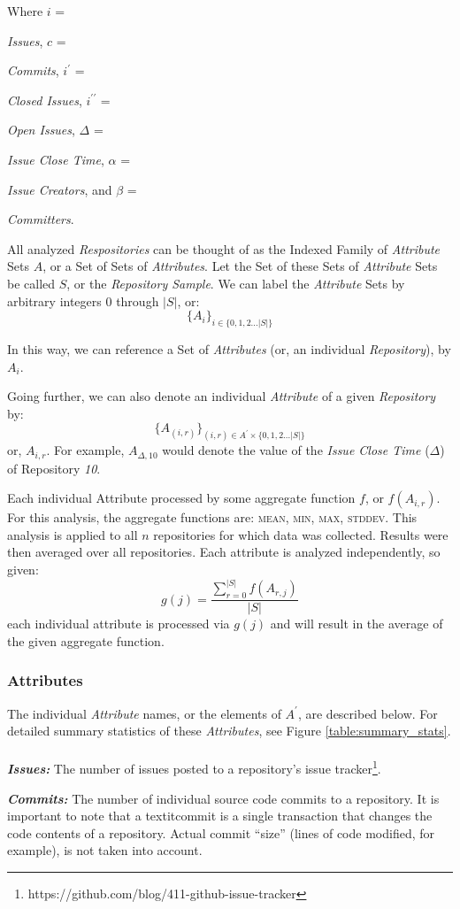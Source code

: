 \documentclass{proc}
\begin{document}
Where $i$ = {\textit{Issues}, $c$ = {\textit{Commits}, $i^\prime$ = {\textit{Closed Issues}, $i^{\prime\prime}$ = {\textit{Open Issues}, $\Delta$ = {\textit{Issue Close Time}, $\alpha$ = {\textit{Issue Creators}, and $\beta$ = {\textit{Committers}.

All analyzed \textit{Respositories} can be thought of as the Indexed Family of \textit{Attribute} Sets $A$, or a Set of Sets of \textit{Attributes}. Let the Set of these Sets of \textit{Attribute} Sets be called $S$, or the \textit{Repository Sample}. We can label the \textit{Attribute} Sets by arbitrary integers 0 through $|S|$, or:
\[ \{A_i\}_{i \in \{0,1,2 ... |S|\} }\]

In this way, we can reference a Set of \textit{Attributes} (or, an individual \textit{Repository}), by $A_i$. 

Going further, we can also denote an individual \textit{Attribute} of a given \textit{Repository} by:
\[ \{A_{(i,r)}\}_{(i,r) \in A^\prime \times \{0,1,2 ... |S|\} } \]
or, $A_{i,r}$. For example, $A_{\Delta,10}$ would denote the value of the \textit{Issue Close Time} ($\Delta$) of Repository \textit{10}.

Each individual Attribute processed by some aggregate function $f$, or $f(  A_{i,r} )$. For this analysis, the aggregate functions are: \textsc{mean}, \textsc{min}, \textsc{max}, \textsc{stddev}. This analysis is applied to all $n$ repositories for which data was collected. Results were then averaged over all repositories. Each attribute is analyzed independently, so given:
\[ g(j) = \frac{\sum\limits_{r = 0}^{|S|} f(  A_{r,j}  ) }{|S|} \]
each individual attribute is processed via $g(j)$ and will result in the average of the given aggregate function.

\subsubsection{Attributes}
\label{sec:attributes}
The individual \textit{Attribute} names, or the elements of $A^\prime$, are described below. For detailed summary statistics of these \textit{Attributes}, see Figure  \ref{table:summary_stats}.\\\\
\noindent \textbf{\textit{Issues:}}
The number of issues posted to a repository's issue tracker\footnote{https://github.com/blog/411-github-issue-tracker}.

\noindent \textbf{\textit{Commits:}}
The number of individual source code commits to a repository. It is important to note that a textit{commit} is a single transaction that changes the code contents of a repository. Actual commit ``size'' (lines of code modified, for example), is not taken into account.

}}}}}}}
\end{document}
